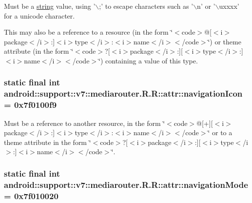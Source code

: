 Must be a \hyperlink{classandroid_1_1support_1_1v7_1_1mediarouter_1_1_r_1_1string}{string} value, using '$\backslash$;' to escape characters such as '$\backslash$n' or '$\backslash$uxxxx' for a unicode character. 

This may also be a reference to a resource (in the form \char`\"{}$<$code$>$@\mbox{[}$<$i$>$package$<$/i$>$:\mbox{]}$<$i$>$type$<$/i$>$:$<$i$>$name$<$/i$>$$<$/code$>$\char`\"{}) or theme attribute (in the form \char`\"{}$<$code$>$?\mbox{[}$<$i$>$package$<$/i$>$:\mbox{]}\mbox{[}$<$i$>$type$<$/i$>$:\mbox{]}$<$i$>$name$<$/i$>$$<$/code$>$\char`\"{}) containing a value of this type. \hypertarget{classandroid_1_1support_1_1v7_1_1mediarouter_1_1_r_1_1attr_e3439952e65c4ee890b282b97efb0d2c}{
\subsubsection[{navigationIcon}]{\setlength{\rightskip}{0pt plus 5cm}static final int android::support::v7::mediarouter.R.R::attr::navigationIcon = 0x7f0100f9}}
\label{classandroid_1_1support_1_1v7_1_1mediarouter_1_1_r_1_1attr_e3439952e65c4ee890b282b97efb0d2c}


Must be a reference to another resource, in the form \char`\"{}$<$code$>$@\mbox{[}+\mbox{]}\mbox{[}$<$i$>$package$<$/i$>$:\mbox{]}$<$i$>$type$<$/i$>$:$<$i$>$name$<$/i$>$$<$/code$>$\char`\"{} or to a theme attribute in the form \char`\"{}$<$code$>$?\mbox{[}$<$i$>$package$<$/i$>$:\mbox{]}\mbox{[}$<$i$>$type$<$/i$>$:\mbox{]}$<$i$>$name$<$/i$>$$<$/code$>$\char`\"{}. \hypertarget{classandroid_1_1support_1_1v7_1_1mediarouter_1_1_r_1_1attr_13b50f14f8998d48ecdd64276ff510db}{
\subsubsection[{navigationMode}]{\setlength{\rightskip}{0pt plus 5cm}static final int android::support::v7::mediarouter.R.R::attr::navigationMode = 0x7f010020}}
\label{classandroid_1_1support_1_1v7_1_1mediarouter_1_1_r_1_1attr_13b50f14f8998d48ecdd64276ff510db}


